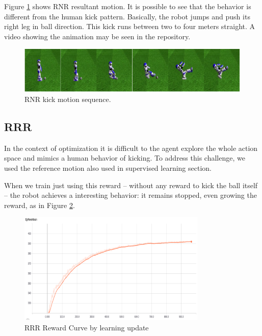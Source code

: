 Figure \ref{fig:rnr_kick_sequence} shows RNR resultant motion. It is possible to see that the behavior is different from the human kick pattern. Basically, the robot jumps and push its right leg in ball direction. This kick runs between two to four meters straight. A video showing the animation may be seen in the repository.

\begin{figure}[!htbp]
	\centering
	\includegraphics[width=1.0\textwidth]{Cap6/rnr_kick_sequence.eps}
	\caption{RNR kick motion sequence.}
	\label{fig:rnr_kick_sequence}
\end{figure}

\subsection{RRR}

In the context of optimization it is difficult to the agent explore the whole action space and mimics a human behavior of kicking. To address this challenge, we used the reference motion also used in supervised learning section.

When we train just using this reward -- without any reward to kick the ball itself -- the robot achieves a interesting behavior: it remains stopped, even growing the reward, as in Figure \ref{fig:rrrreward}.

\begin{figure}[!htbp]
	\centering
	\includegraphics[width=0.8\textwidth]{Cap6/rrrreward.eps}
	\caption{RRR Reward Curve by learning update}
	\label{fig:rrrreward}
\end{figure}

